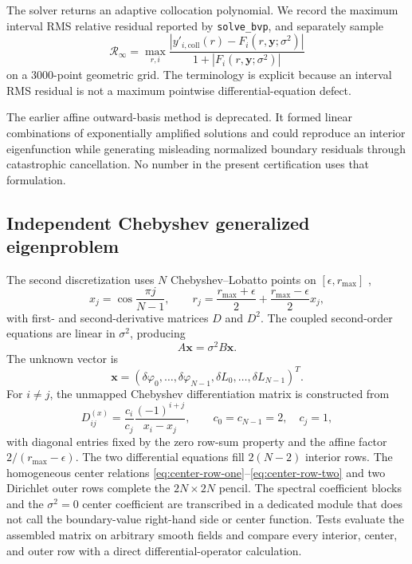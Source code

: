 \documentclass[aps,prd,preprint,onecolumn,nofootinbib,superscriptaddress,showkeys]{revtex4-2}
\newcommand{\sigmatwo}{\sigma^{2}}
\newcommand{\rmax}{r_{\mathrm{max}}}
\newcommand{\code}[1]{\texttt{#1}}
\begin{document}
The solver returns an adaptive collocation polynomial. We record the maximum interval RMS relative residual reported by \code{solve\_bvp}, and separately sample
\begin{equation}
\mathcal{R}_{\infty}=\max_{r,i}
\frac{|y'_{i,\mathrm{coll}}(r)-F_{i}(r,\bm{y};\sigmatwo)|}{1+|F_{i}(r,\bm{y};\sigmatwo)|}
\end{equation}
on a 3000-point geometric grid. The terminology is explicit because an interval RMS residual is not a maximum pointwise differential-equation defect.

The earlier affine outward-basis method is deprecated. It formed linear combinations of exponentially amplified solutions and could reproduce an interior eigenfunction while generating misleading normalized boundary residuals through catastrophic cancellation. No number in the present certification uses that formulation.

\subsection{Independent Chebyshev generalized eigenproblem}

The second discretization uses $N$ Chebyshev--Lobatto points on $[\epsilon,\rmax]$ \cite{Trefethen2000,Boyd2001},
\begin{equation}
x_{j}=\cos\frac{\pi j}{N-1},
\qquad
r_{j}=\frac{\rmax+\epsilon}{2}+\frac{\rmax-\epsilon}{2}x_{j},
\end{equation}
with first- and second-derivative matrices $D$ and $D^{2}$. The coupled second-order equations are linear in $\sigmatwo$, producing
\begin{equation}
A\bm{x}=\sigmatwo B\bm{x}.
\label{eq:pencil}
\end{equation}
The unknown vector is
\begin{equation}
\bm{x}=
\left(\delta\varphi_{0},\ldots,\delta\varphi_{N-1},
\delta L_{0},\ldots,\delta L_{N-1}\right)^{T}.
\label{eq:spectral-vector}
\end{equation}
For $i\ne j$, the unmapped Chebyshev differentiation matrix is constructed from
\begin{equation}
D^{(x)}_{ij}=\frac{c_{i}}{c_{j}}
\frac{(-1)^{i+j}}{x_{i}-x_{j}},
\qquad
c_{0}=c_{N-1}=2,\quad c_{j}=1,
\label{eq:cheb-d}
\end{equation}
with diagonal entries fixed by the zero row-sum property and the affine factor $2/(\rmax-\epsilon)$. The two differential equations fill $2(N-2)$ interior rows. The homogeneous center relations \eqref{eq:center-row-one}--\eqref{eq:center-row-two} and two Dirichlet outer rows complete the $2N\times2N$ pencil.
The spectral coefficient blocks and the $\sigmatwo=0$ center coefficient are transcribed in a dedicated module that does not call the boundary-value right-hand side or center function. Tests evaluate the assembled matrix on arbitrary smooth fields and compare every interior, center, and outer row with a direct differential-operator calculation.
\end{document}
